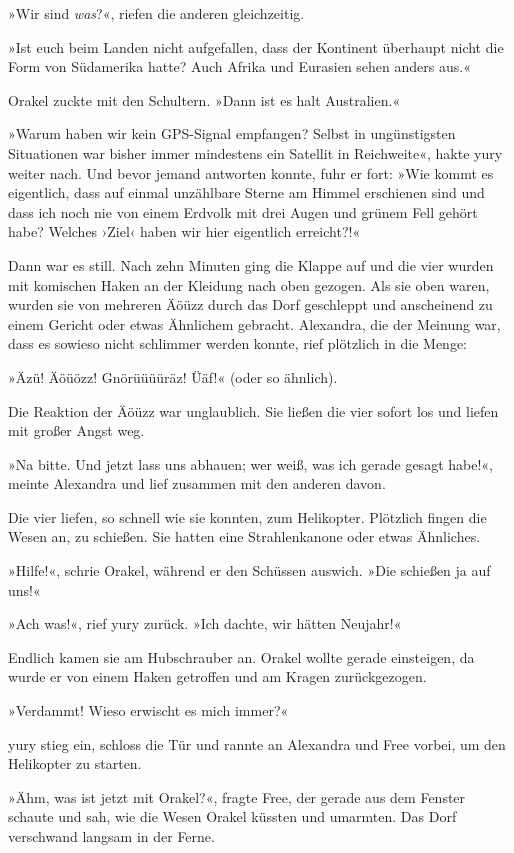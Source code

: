 »Wir sind \emph{was}?«, riefen die anderen gleichzeitig.

»Ist euch beim Landen nicht aufgefallen, dass der Kontinent überhaupt nicht die Form von Südamerika hatte? Auch Afrika und Eurasien sehen anders aus.«

Orakel zuckte mit den Schultern. »Dann ist es halt Australien.«

»Warum haben wir kein GPS-Signal empfangen? Selbst in ungünstigsten Situationen war bisher immer mindestens ein Satellit in Reichweite«, hakte yury weiter nach. Und bevor jemand antworten konnte, fuhr er fort: »Wie kommt es eigentlich, dass auf einmal unzählbare Sterne am Himmel erschienen sind und dass ich noch nie von einem Erdvolk mit drei Augen und grünem Fell gehört habe? Welches ›Ziel‹ haben wir hier eigentlich erreicht?!«

Dann war es still. Nach zehn Minuten ging die Klappe auf und die vier wurden mit komischen Haken an der Kleidung nach oben gezogen. Als sie oben waren, wurden sie von mehreren Äöüzz durch das Dorf geschleppt und anscheinend zu einem Gericht oder etwas Ähnlichem gebracht. Alexandra, die der Meinung war, dass es sowieso nicht schlimmer werden konnte, rief plötzlich in die Menge:

»Äzü! Äöüözz! Gnörüüüüräz! Üäf!« (oder so ähnlich).

Die Reaktion der Äöüzz war unglaublich. Sie ließen die vier sofort los und liefen mit großer Angst weg.

»Na bitte. Und jetzt lass uns abhauen; wer weiß, was ich gerade gesagt habe!«, meinte Alexandra und lief zusammen mit den anderen davon.

Die vier liefen, so schnell wie sie konnten, zum Helikopter. Plötzlich fingen die Wesen an, zu schießen. Sie hatten eine Strahlenkanone oder etwas Ähnliches.

»Hilfe!«, schrie Orakel, während er den Schüssen auswich. »Die schießen ja auf uns!«

»Ach was!«, rief yury zurück. »Ich dachte, wir hätten Neujahr!«

Endlich kamen sie am Hubschrauber an. Orakel wollte gerade einsteigen, da wurde er von einem Haken getroffen und am Kragen zurückgezogen.

»Verdammt! Wieso erwischt es mich immer?«

yury stieg ein, schloss die Tür und rannte an Alexandra und Free vorbei, um den Helikopter zu starten.

»Ähm, was ist jetzt mit Orakel?«, fragte Free, der gerade aus dem Fenster schaute und sah, wie die Wesen Orakel küssten und umarmten. Das Dorf verschwand langsam in der Ferne.

